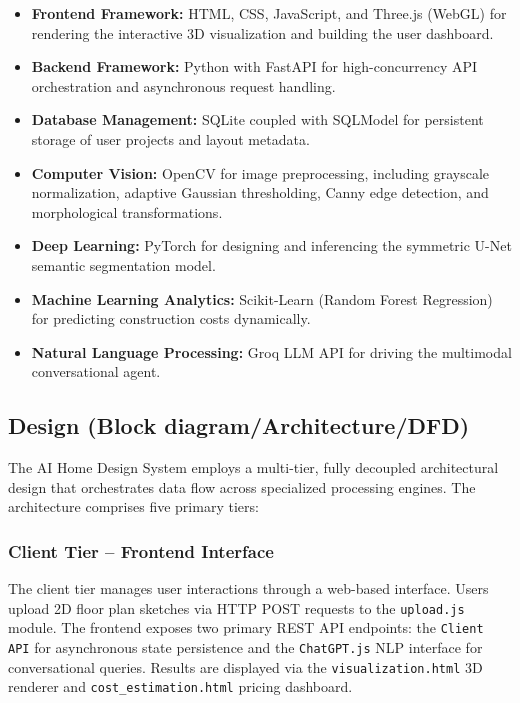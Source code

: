 \documentclass[12pt]{report}
\begin{document}
\begin{itemize}
  \item \textbf{Frontend Framework:} HTML, CSS, JavaScript, and Three.js (WebGL)\cite{threejs2024} for rendering the interactive 3D visualization and building the user dashboard.
  \item \textbf{Backend Framework:} Python with FastAPI\cite{fastapi2024} for high-concurrency API orchestration and asynchronous request handling.
  \item \textbf{Database Management:} SQLite\cite{fastapi2024} coupled with SQLModel for persistent storage of user projects and layout metadata.
  \item \textbf{Computer Vision:} OpenCV\cite{opencv2024} for image preprocessing, including grayscale normalization, adaptive Gaussian thresholding, Canny edge detection, and morphological transformations\cite{canny1986}.
  \item \textbf{Deep Learning:} PyTorch\cite{pytorch2024} for designing and inferencing the symmetric U-Net semantic segmentation model\cite{ronneberger2015}.
  \item \textbf{Machine Learning Analytics:} Scikit-Learn\cite{sklearn2024} (Random Forest Regression) for predicting construction costs dynamically\cite{wang2020, breiman2001}.
  \item \textbf{Natural Language Processing:} Groq LLM API\cite{groq2024} for driving the multimodal conversational agent\cite{brown2020, vaswani2017}.
\end{itemize}

\subsection{Design (Block diagram/Architecture/DFD)}

The AI Home Design System employs a multi-tier, fully decoupled architectural design that orchestrates data flow across specialized processing engines. The architecture comprises five primary tiers:

\subsubsection{Client Tier -- Frontend Interface}

The client tier manages user interactions through a web-based interface. Users upload 2D floor plan sketches via HTTP POST requests to the \texttt{upload.js} module. The frontend exposes two primary REST API endpoints: the \texttt{Client API} for asynchronous state persistence and the \texttt{ChatGPT.js} NLP interface for conversational queries\cite{brown2020}. Results are displayed via the \texttt{visualization.html} 3D renderer and \texttt{cost\_estimation.html} pricing dashboard\cite{threejs2024}.
\end{document}
